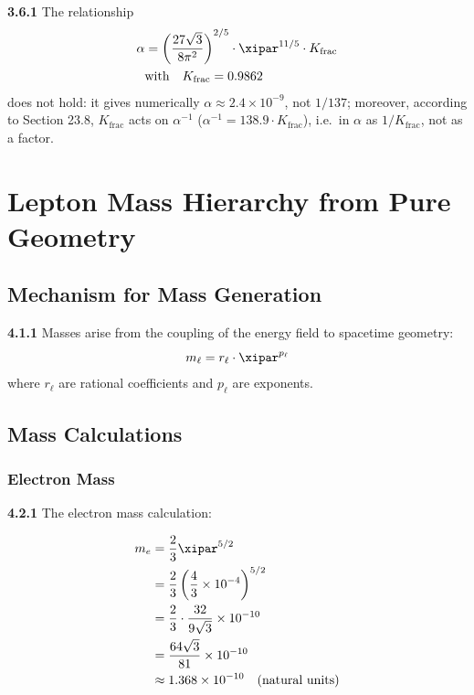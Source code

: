 	\noindent \textbf{3.6.1} The relationship
	\begin{align}
		\alpha &= \left( \frac{27 \sqrt{3}}{8 \pi^2} \right)^{2/5} \cdot \xipar^{11/5} \cdot K_{\text{frac}} \\
		&\text{with} \quad K_{\text{frac}} = 0.9862
	\end{align}
	does not hold: it gives numerically $\alpha \approx 2.4\times10^{-9}$, not $1/137$; moreover, according to Section 23.8, $K_{\text{frac}}$ acts on $\alpha^{-1}$ ($\alpha^{-1} = 138.9\cdot K_{\text{frac}}$), i.e.\ in $\alpha$ as $1/K_{\text{frac}}$, not as a factor.

	\section{Lepton Mass Hierarchy from Pure Geometry}
	
	\subsection{Mechanism for Mass Generation}
	
	\noindent \textbf{4.1.1} Masses arise from the coupling of the energy field to spacetime geometry:
	\begin{equation}
		m_{\ell} = r_{\ell} \cdot \xipar^{p_{\ell}}
	\end{equation}
	where $r_{\ell}$ are rational coefficients and $p_{\ell}$ are exponents.
	
	\subsection{Mass Calculations}
	
	\subsubsection{Electron Mass}
	
	\noindent \textbf{4.2.1} The electron mass calculation:
	\begin{keyresult}
		\begin{align}
			m_e &= \frac{2}{3} \xipar^{5/2} \\
			&= \frac{2}{3} \left( \frac{4}{3} \times 10^{-4} \right)^{5/2} \\
			&= \frac{2}{3} \cdot \frac{32}{9 \sqrt{3}} \times 10^{-10} \\
			&= \frac{64 \sqrt{3}}{81} \times 10^{-10} \\
			&\approx 1.368 \times 10^{-10} \quad \text{(natural units)}
		\end{align}
	\end{keyresult}
	
